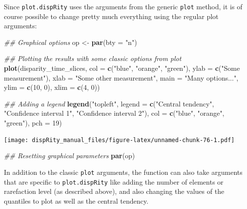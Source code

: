 \documentclass[]{book}
\newenvironment{Shaded}{\begin{snugshade}}{\end{snugshade}}
\newcommand{\CommentTok}[1]{\textcolor[rgb]{0.56,0.35,0.01}{\textit{#1}}}
\newcommand{\DataTypeTok}[1]{\textcolor[rgb]{0.13,0.29,0.53}{#1}}
\newcommand{\DecValTok}[1]{\textcolor[rgb]{0.00,0.00,0.81}{#1}}
\newcommand{\KeywordTok}[1]{\textcolor[rgb]{0.13,0.29,0.53}{\textbf{#1}}}
\newcommand{\NormalTok}[1]{#1}
\newcommand{\StringTok}[1]{\textcolor[rgb]{0.31,0.60,0.02}{#1}}
\begin{document}
Since \texttt{plot.dispRity} uses the arguments from the generic \texttt{plot} method, it is of course possible to change pretty much everything using the regular plot arguments:

\begin{Shaded}
\begin{Highlighting}[]
\CommentTok{## Graphical options}
\NormalTok{op <-}\StringTok{ }\KeywordTok{par}\NormalTok{(}\DataTypeTok{bty =} \StringTok{"n"}\NormalTok{)}

\CommentTok{## Plotting the results with some classic options from plot}
\KeywordTok{plot}\NormalTok{(disparity_time_slices, }\DataTypeTok{col =} \KeywordTok{c}\NormalTok{(}\StringTok{"blue"}\NormalTok{, }\StringTok{"orange"}\NormalTok{, }\StringTok{"green"}\NormalTok{),}
    \DataTypeTok{ylab =} \KeywordTok{c}\NormalTok{(}\StringTok{"Some measurement"}\NormalTok{), }\DataTypeTok{xlab =} \StringTok{"Some other measurement"}\NormalTok{,}
    \DataTypeTok{main =} \StringTok{"Many options..."}\NormalTok{, }\DataTypeTok{ylim =} \KeywordTok{c}\NormalTok{(}\DecValTok{10}\NormalTok{, }\DecValTok{0}\NormalTok{), }\DataTypeTok{xlim =} \KeywordTok{c}\NormalTok{(}\DecValTok{4}\NormalTok{, }\DecValTok{0}\NormalTok{))}

\CommentTok{## Adding a legend}
\KeywordTok{legend}\NormalTok{(}\StringTok{"topleft"}\NormalTok{, }\DataTypeTok{legend =} \KeywordTok{c}\NormalTok{(}\StringTok{"Central tendency"}\NormalTok{,}
                             \StringTok{"Confidence interval 1"}\NormalTok{,}
                             \StringTok{"Confidence interval 2"}\NormalTok{),}
      \DataTypeTok{col =} \KeywordTok{c}\NormalTok{(}\StringTok{"blue"}\NormalTok{, }\StringTok{"orange"}\NormalTok{, }\StringTok{"green"}\NormalTok{), }\DataTypeTok{pch =} \DecValTok{19}\NormalTok{)}
\end{Highlighting}
\end{Shaded}

\texttt{[image: dispRity\_manual\_files/figure-latex/unnamed-chunk-76-1.pdf]}

\begin{Shaded}
\begin{Highlighting}[]
\CommentTok{## Resetting graphical parameters}
\KeywordTok{par}\NormalTok{(op)}
\end{Highlighting}
\end{Shaded}

In addition to the classic \texttt{plot} arguments, the function can also take arguments that are specific to \texttt{plot.dispRity} like adding the number of elements or rarefaction level (as described above), and also changing the values of the quantiles to plot as well as the central tendency.
\end{document}
